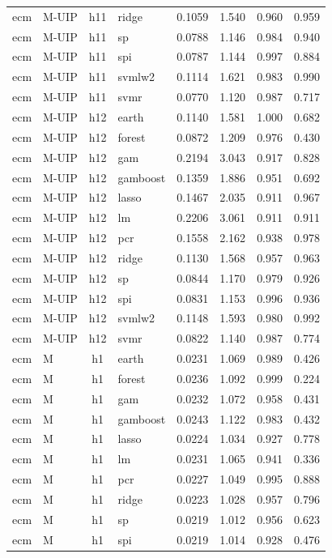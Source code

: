 \begin{ThreePartTable}
\begin{longtable}[t]{llclcccc}
ecm & M-UIP & h11 & ridge & 0.1059 & 1.540 & 0.960 & 0.959\\
ecm & M-UIP & h11 & sp & 0.0788 & 1.146 & 0.984 & 0.940\\
ecm & M-UIP & h11 & spi & 0.0787 & 1.144 & 0.997 & 0.884\\
ecm & M-UIP & h11 & svmlw2 & 0.1114 & 1.621 & 0.983 & 0.990\\
ecm & M-UIP & h11 & svmr & 0.0770 & 1.120 & 0.987 & 0.717\\
\addlinespace
ecm & M-UIP & h12 & earth & 0.1140 & 1.581 & 1.000 & 0.682\\
ecm & M-UIP & h12 & forest & 0.0872 & 1.209 & 0.976 & 0.430\\
ecm & M-UIP & h12 & gam & 0.2194 & 3.043 & 0.917 & 0.828\\
ecm & M-UIP & h12 & gamboost & 0.1359 & 1.886 & 0.951 & 0.692\\
ecm & M-UIP & h12 & lasso & 0.1467 & 2.035 & 0.911 & 0.967\\
ecm & M-UIP & h12 & lm & 0.2206 & 3.061 & 0.911 & 0.911\\
ecm & M-UIP & h12 & pcr & 0.1558 & 2.162 & 0.938 & 0.978\\
ecm & M-UIP & h12 & ridge & 0.1130 & 1.568 & 0.957 & 0.963\\
ecm & M-UIP & h12 & sp & 0.0844 & 1.170 & 0.979 & 0.926\\
ecm & M-UIP & h12 & spi & 0.0831 & 1.153 & 0.996 & 0.936\\
ecm & M-UIP & h12 & svmlw2 & 0.1148 & 1.593 & 0.980 & 0.992\\
ecm & M-UIP & h12 & svmr & 0.0822 & 1.140 & 0.987 & 0.774\\
\addlinespace
ecm & M & h1 & earth & 0.0231 & 1.069 & 0.989 & 0.426\\
ecm & M & h1 & forest & 0.0236 & 1.092 & 0.999 & 0.224\\
ecm & M & h1 & gam & 0.0232 & 1.072 & 0.958 & 0.431\\
ecm & M & h1 & gamboost & 0.0243 & 1.122 & 0.983 & 0.432\\
ecm & M & h1 & lasso & 0.0224 & 1.034 & 0.927 & 0.778\\
ecm & M & h1 & lm & 0.0231 & 1.065 & 0.941 & 0.336\\
ecm & M & h1 & pcr & 0.0227 & 1.049 & 0.995 & 0.888\\
ecm & M & h1 & ridge & 0.0223 & 1.028 & 0.957 & 0.796\\
ecm & M & h1 & sp & 0.0219 & 1.012 & 0.956 & 0.623\\
ecm & M & h1 & spi & 0.0219 & 1.014 & 0.928 & 0.476\\

\end{longtable}
\end{ThreePartTable}
